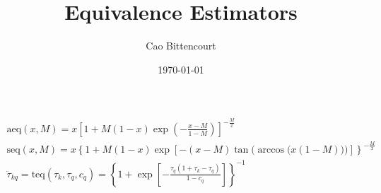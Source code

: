 \documentclass{article}
\title{Equivalence Estimators}
\author{Cao Bittencourt}
\date{\today}
\begin{document}
    \begin{gather}
        \text{aeq}(x,M) = x \left[
            1 + M(1-x)\exp\left(
                -\frac{x-M}{1-M}
            \right)
        \right] ^ {-\frac{M}{x}}\\
        \text{seq}(x,M) = x \left\{ 
            1 + M(1-x)\exp\left[
                -(x-M)
                \tan\bigg(
                    \arccos\big(
                        x(1-M)
                    \big)
                \bigg)
            \right]
        \right\} ^ {-\frac{M}{x}}\\
        \ddot{\tau}_{kq} = 
        \text{teq}(\tau_{k}, \tau_{q}, c_{q}) = 
        \left\{
            1 + \exp[-
                \frac{
                    \tau_{q}
                    (1 + \tau_{k} - \tau_{q})
                }{
                    1 - c_{q}
                }
            ]
        \right\} ^ {-1}
    \end{gather}
\end{document}
